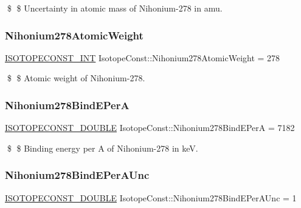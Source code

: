 \$ \$ Uncertainty in atomic mass of Nihonium-\/278 in amu. \mbox{\label{group___isotope_const-_nihonium-_nh278_ga8267cafc98345558b3a45f6abf4a8573}} 
\subsubsection{\texorpdfstring{Nihonium278\+Atomic\+Weight}{Nihonium278AtomicWeight}}
{\footnotesize\ttfamily \mbox{\hyperlink{group___isotope_const-_macros_ga5f18360b3e99483a35c32d789e62621c}{I\+S\+O\+T\+O\+P\+E\+C\+O\+N\+S\+T\+\_\+\+I\+NT}} Isotope\+Const\+::\+Nihonium278\+Atomic\+Weight = 278}

\$ \$ Atomic weight of Nihonium-\/278. \mbox{\label{group___isotope_const-_nihonium-_nh278_ga54820e89b928401870bfed00b2cc3992}} 
\subsubsection{\texorpdfstring{Nihonium278\+Bind\+E\+PerA}{Nihonium278BindEPerA}}
{\footnotesize\ttfamily \mbox{\hyperlink{group___isotope_const-_macros_ga8f45a7272ce02c0b4c65c44636ed719a}{I\+S\+O\+T\+O\+P\+E\+C\+O\+N\+S\+T\+\_\+\+D\+O\+U\+B\+LE}} Isotope\+Const\+::\+Nihonium278\+Bind\+E\+PerA = 7182}

\$ \$ Binding energy per A of Nihonium-\/278 in keV. \mbox{\label{group___isotope_const-_nihonium-_nh278_gaf646a8543aa5dbf25e0b93d8377730c5}} 
\subsubsection{\texorpdfstring{Nihonium278\+Bind\+E\+Per\+A\+Unc}{Nihonium278BindEPerAUnc}}
{\footnotesize\ttfamily \mbox{\hyperlink{group___isotope_const-_macros_ga8f45a7272ce02c0b4c65c44636ed719a}{I\+S\+O\+T\+O\+P\+E\+C\+O\+N\+S\+T\+\_\+\+D\+O\+U\+B\+LE}} Isotope\+Const\+::\+Nihonium278\+Bind\+E\+Per\+A\+Unc = 1}

